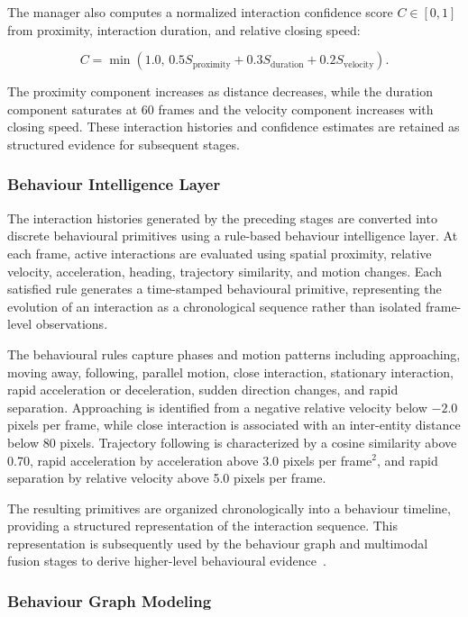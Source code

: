 \documentclass[runningheads]{llncs}
\begin{document}
The manager also computes a normalized interaction confidence score
$C\in[0,1]$ from proximity, interaction duration, and relative closing
speed:

\begin{equation}
C =
\min\left(1.0,\,
0.5S_{\mathrm{proximity}}
+0.3S_{\mathrm{duration}}
+0.2S_{\mathrm{velocity}}\right).
\end{equation}

The proximity component increases as distance decreases, while the duration
component saturates at 60 frames and the velocity component increases with
closing speed. These interaction histories and confidence estimates are
retained as structured evidence for subsequent stages.

\subsubsection{Behaviour Intelligence Layer}

The interaction histories generated by the preceding stages are converted
into discrete behavioural primitives using a rule-based behaviour
intelligence layer. At each frame, active interactions are evaluated using
spatial proximity, relative velocity, acceleration, heading, trajectory
similarity, and motion changes. Each satisfied rule generates a
time-stamped behavioural primitive, representing the evolution of an
interaction as a chronological sequence rather than isolated frame-level
observations.

The behavioural rules capture phases and motion patterns including
approaching, moving away, following, parallel motion, close interaction,
stationary interaction, rapid acceleration or deceleration, sudden
direction changes, and rapid separation. Approaching is identified from a
negative relative velocity below $-2.0$ pixels per frame, while close
interaction is associated with an inter-entity distance below 80 pixels.
Trajectory following is characterized by a cosine similarity above 0.70,
rapid acceleration by acceleration above 3.0 pixels per frame$^2$, and rapid
separation by relative velocity above 5.0 pixels per frame.

The resulting primitives are organized chronologically into a behaviour
timeline, providing a structured representation of the interaction sequence.
This representation is subsequently used by the behaviour graph and
multimodal fusion stages to derive higher-level behavioural
evidence~\cite{yan2018stgcn}.

\subsubsection{Behaviour Graph Modeling}
\end{document}
